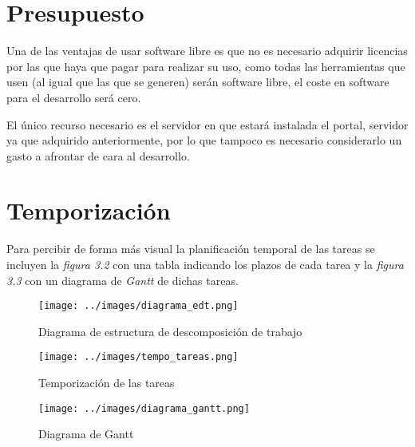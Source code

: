 \section{Presupuesto}

Una de las ventajas de usar software libre es que no es necesario adquirir licencias por las que haya que pagar para realizar su uso, como todas las herramientas que usen (al igual que las que se generen) serán software libre, el coste en software para el desarrollo será cero.

\bigskip

El único recurso necesario es el servidor en que estará instalada el portal, servidor ya que adquirido anteriormente, por lo que tampoco es necesario considerarlo un gasto a afrontar de cara al desarrollo.

\section{Temporización}

Para percibir de forma más visual la planificación temporal de las tareas se incluyen la \textit{figura 3.2} con una tabla indicando los plazos de cada tarea y la \textit{figura 3.3} con un diagrama de \textit{Gantt} de dichas tareas.
\newpage

\begin{figure}[!ht]
  \begin{center}
    \texttt{[image: ../images/diagrama\_edt.png]}
    \caption{Diagrama de estructura de descomposición de trabajo}
    \label{fig:diag_edt}
  \end{center}
\end{figure}

\newpage
\begin{figure}[!ht]
  \begin{center}
    \texttt{[image: ../images/tempo\_tareas.png]}
    \caption{Temporización de las tareas}
    \label{fig:tempo_tareas}
  \end{center}
\end{figure}

\begin{figure}[!ht]
  \begin{center}
    \texttt{[image: ../images/diagrama\_gantt.png]}
    \caption{Diagrama de Gantt}
    \label{fig:diag_gant}
  \end{center}
\end{figure}